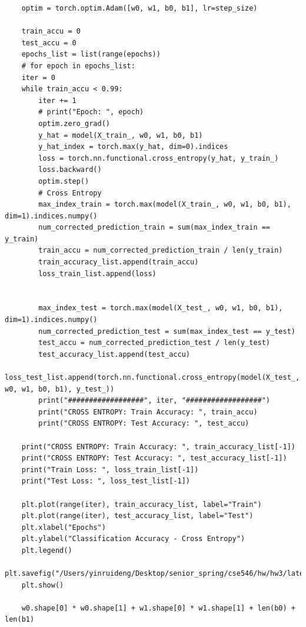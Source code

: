\documentclass{article}
\begin{document}
\begin{verbatim}
	optim = torch.optim.Adam([w0, w1, b0, b1], lr=step_size)
	
	train_accu = 0
	test_accu = 0
	epochs_list = list(range(epochs))
	# for epoch in epochs_list:
	iter = 0
	while train_accu < 0.99:
		iter += 1
		# print("Epoch: ", epoch)
		optim.zero_grad()
		y_hat = model(X_train_, w0, w1, b0, b1)
		y_hat_index = torch.max(y_hat, dim=0).indices
		loss = torch.nn.functional.cross_entropy(y_hat, y_train_)
		loss.backward()
		optim.step()
		# Cross Entropy
		max_index_train = torch.max(model(X_train_, w0, w1, b0, b1), dim=1).indices.numpy()
		num_corrected_prediction_train = sum(max_index_train == y_train)
		train_accu = num_corrected_prediction_train / len(y_train)
		train_accuracy_list.append(train_accu)
		loss_train_list.append(loss)
		
		
		max_index_test = torch.max(model(X_test_, w0, w1, b0, b1), dim=1).indices.numpy()
		num_corrected_prediction_test = sum(max_index_test == y_test)
		test_accu = num_corrected_prediction_test / len(y_test)
		test_accuracy_list.append(test_accu)
		loss_test_list.append(torch.nn.functional.cross_entropy(model(X_test_, w0, w1, b0, b1), y_test_))
		print("##################", iter, "##################")
		print("CROSS ENTROPY: Train Accuracy: ", train_accu)
		print("CROSS ENTROPY: Test Accuracy: ", test_accu)
		
	print("CROSS ENTROPY: Train Accuracy: ", train_accuracy_list[-1])
	print("CROSS ENTROPY: Test Accuracy: ", test_accuracy_list[-1])
	print("Train Loss: ", loss_train_list[-1])
	print("Test Loss: ", loss_test_list[-1])
	
	plt.plot(range(iter), train_accuracy_list, label="Train")
	plt.plot(range(iter), test_accuracy_list, label="Test")
	plt.xlabel("Epochs")
	plt.ylabel("Classification Accuracy - Cross Entropy")
	plt.legend()
	plt.savefig("/Users/yinruideng/Desktop/senior_spring/cse546/hw/hw3/latex/plots/A5a.png")
	plt.show()
	
	w0.shape[0] * w0.shape[1] + w1.shape[0] * w1.shape[1] + len(b0) + len(b1)




\end{verbatim}
\end{document}
